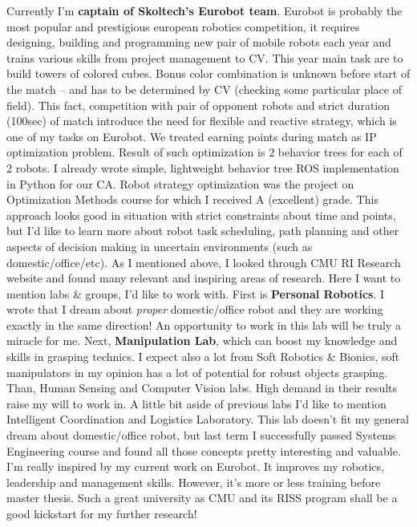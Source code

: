 \documentclass[11pt,a4paper,roman]{moderncv}        %
\begin{document}
Currently I'm \textbf{captain of Skoltech's Eurobot team}. Eurobot is probably the most popular and prestigious european robotics competition, it requires designing, building and programming new pair of mobile robots each year and trains various skills from project management to CV. This year main task are to build towers of colored cubes. Bonus color combination is unknown before start of the match -- and has to be determined by CV (checking some particular place of field). This fact, competition with pair of opponent robots and strict duration (100sec) of match introduce the need for flexible and reactive strategy, which is one of my tasks on Eurobot. We treated earning points during match as IP optimization problem. Result of such optimization is 2 behavior trees for each of 2 robots. I already wrote simple, lightweight behavior tree ROS implementation in Python for our CA. Robot strategy optimization was the project on Optimization Methods course for which I received A (excellent) grade. This approach looks good in situation with strict constraints about time and points, but I'd like to learn more about robot task scheduling, path planning and other aspects of decision making in uncertain environments (such as domestic/office/etc).
\newline
\newline
As I mentioned above, I looked through CMU RI Research website and found many relevant and inspiring areas of research. Here I want to mention labs \& groups, I'd like to work with. First is \textbf{Personal Robotics}. I wrote that I dream about \textit{proper} domestic/office robot and they are working exactly in the same direction! An opportunity to work in this lab will be truly a miracle for me. Next, \textbf{Manipulation Lab}, which can boost my knowledge and skills in grasping technics. I expect also a lot from Soft Robotics \& Bionics, soft manipulators in my opinion has a lot of potential for robust objects grasping. Than, Human Sensing and Computer Vision labs. High demand in their results raise my will to work in. A little bit aside of previous labs I'd like to mention  Intelligent Coordination and Logistics Laboratory. This lab doesn't fit my general dream about domestic/office robot, but last term I successfully passed Systems Engineering course and found all those concepts pretty interesting and valuable.
\newline
\newline
I'm really inspired by my current work on Eurobot. It improves my robotics, leadership and management skills. However, it's more or less training before master thesis. Such a great university as CMU and its RISS program shall be a good kickstart for my further research! \newline
\newline


\makeletterclosing
\end{document}
